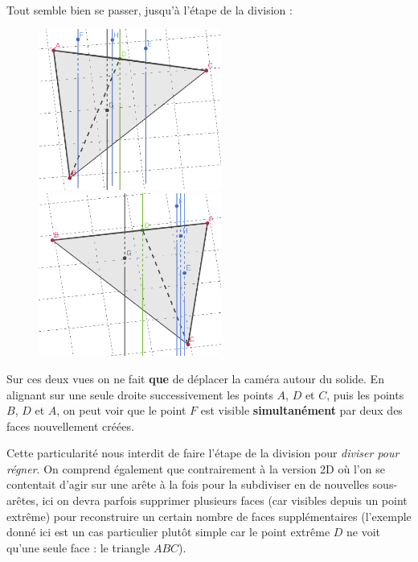 \documentclass[]{article}
\begin{document}
\paragraph{}
Tout semble bien se passer, jusqu'à l'étape de la division :

\begin{figure}[H]
	\begin{center}
		\includegraphics[width=6cm]{qh3d/geogebra-export6.png}
		\includegraphics[width=6cm]{qh3d/geogebra-export7.png}
	\end{center}
\end{figure}

Sur ces deux vues on ne fait \textbf{que} de déplacer la caméra autour du solide.
En alignant sur une seule droite successivement les points $A$, $D$ et $C$, puis les points $B$, $D$ et $A$, on peut voir que le point $F$ est visible \textbf{simultanément} par deux des faces nouvellement créées.

Cette particularité nous interdit de faire l'étape de la division pour \emph{diviser pour régner}. On comprend également que contrairement à la version 2D où l'on se contentait d'agir sur une arête à la fois pour la subdiviser en de nouvelles sous-arêtes, ici on devra parfois supprimer plusieurs faces (car visibles depuis un point extrême) pour reconstruire un certain nombre de faces supplémentaires (l'exemple donné ici est un cas particulier plutôt simple car le point extrême $D$ ne voit qu'une seule face : le triangle $ABC$).
\end{document}
